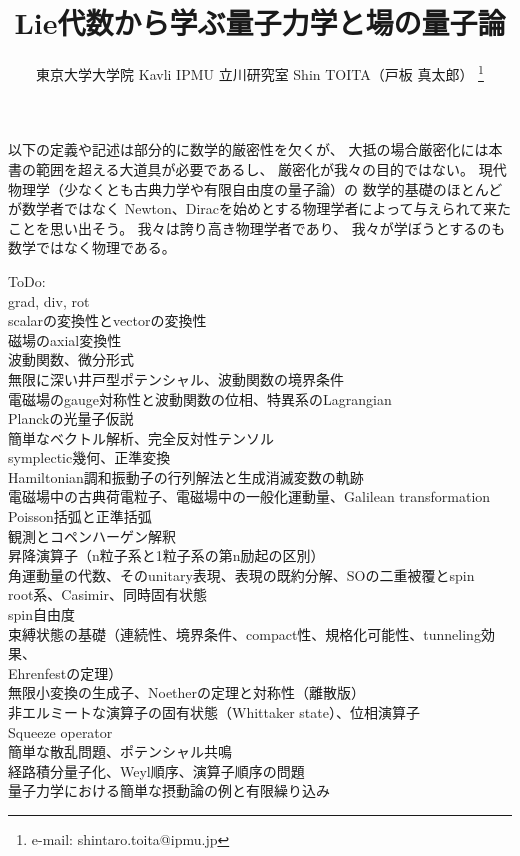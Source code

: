 \documentclass[dvipdfmx]{jsarticle}
\title{Lie代数から学ぶ量子力学と場の量子論}
\author{東京大学大学院 Kavli IPMU 立川研究室 \hspace{15pt}Shin TOITA（戸板 真太郎）
\thanks{e-mail: shintaro.toita@ipmu.jp}}
\begin{document}
\maketitle
\vspace{-4zh}

\tableofcontents
\newpage

以下の定義や記述は部分的に数学的厳密性を欠くが、
大抵の場合厳密化には本書の範囲を超える大道具が必要であるし、
厳密化が我々の目的ではない。
現代物理学（少なくとも古典力学や有限自由度の量子論）の
数学的基礎のほとんどが数学者ではなく
Newton、Diracを始めとする物理学者によって与えられて来たことを思い出そう。
我々は誇り高き物理学者であり、
我々が学ぼうとするのも数学ではなく物理である。

ToDo:
\\grad, div, rot
\\scalarの変換性とvectorの変換性
\\磁場のaxial変換性
\\波動関数、微分形式
\\無限に深い井戸型ポテンシャル、波動関数の境界条件
\\電磁場のgauge対称性と波動関数の位相、特異系のLagrangian
\\Planckの光量子仮説 
\\簡単なベクトル解析、完全反対性テンソル
\\symplectic幾何、正準変換
\\Hamiltonian調和振動子の行列解法と生成消滅変数の軌跡
\\電磁場中の古典荷電粒子、電磁場中の一般化運動量、Galilean transformation 
\\Poisson括弧と正準括弧
\\観測とコペンハーゲン解釈
\\昇降演算子（n粒子系と1粒子系の第n励起の区別）
\\角運動量の代数、そのunitary表現、表現の既約分解、SOの二重被覆とspin
\\root系、Casimir、同時固有状態
\\spin自由度
\\束縛状態の基礎（連続性、境界条件、compact性、規格化可能性、tunneling効果、
\\Ehrenfestの定理）
\\無限小変換の生成子、Noetherの定理と対称性（離散版）
\\非エルミートな演算子の固有状態（Whittaker state）、位相演算子
\\Squeeze operator
\\簡単な散乱問題、ポテンシャル共鳴
\\経路積分量子化、Weyl順序、演算子順序の問題
\\量子力学における簡単な摂動論の例と有限繰り込み
\end{document}
